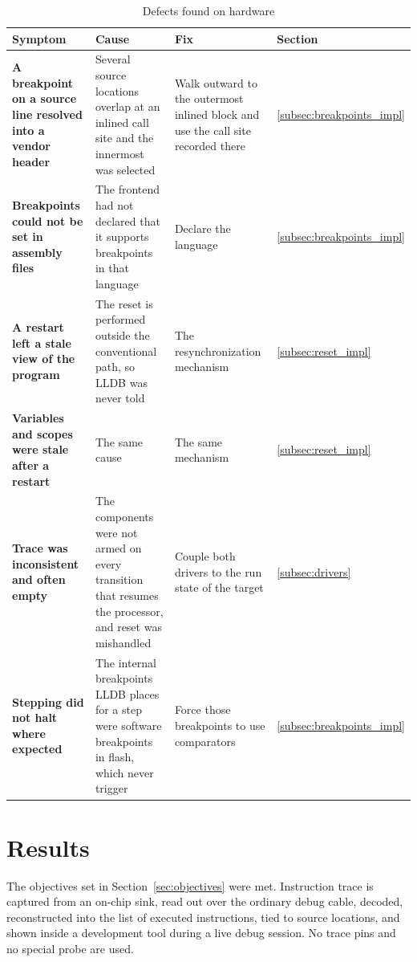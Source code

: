 \begin{table}[htbp]
    \centering
    \caption{Defects found on hardware}
    \label{tab:defects}
    \begin{tabularx}{\linewidth}{| @{}>{\hsize\bfseries}Y | >{\hsize}Y | >{\hsize}Y | >{\hsize}Y@{} |}
        \hline
        Symptom & \textbf{Cause} & \textbf{Fix} & \textbf{Section} \\
        \hline
        A breakpoint on a source line resolved into a vendor header & Several source locations overlap at an inlined call site and the innermost was selected & Walk outward to the outermost inlined block and use the call site recorded there & \ref{subsec:breakpoints_impl} \\
        \hline
        Breakpoints could not be set in assembly files & The frontend had not declared that it supports breakpoints in that language & Declare the language & \ref{subsec:breakpoints_impl} \\
        \hline
        A restart left a stale view of the program & The reset is performed outside the conventional path, so LLDB was never told & The resynchronization mechanism & \ref{subsec:reset_impl} \\
        \hline
        Variables and scopes were stale after a restart & The same cause & The same mechanism & \ref{subsec:reset_impl} \\
        \hline
        Trace was inconsistent and often empty & The components were not armed on every transition that resumes the processor, and reset was mishandled & Couple both drivers to the run state of the target & \ref{subsec:drivers} \\
        \hline
        Stepping did not halt where expected & The internal breakpoints LLDB places for a step were software breakpoints in flash, which never trigger & Force those breakpoints to use comparators & \ref{subsec:breakpoints_impl} \\
        \hline
    \end{tabularx}
\end{table}


\section{Results}
\label{sec:results}
The objectives set in Section~\ref{sec:objectives} were met. Instruction trace is captured from an on-chip sink, read out over the ordinary debug cable, decoded, reconstructed into the list of executed instructions, tied to source locations, and shown inside a development tool during a live debug session. No trace pins and no special probe are used.

